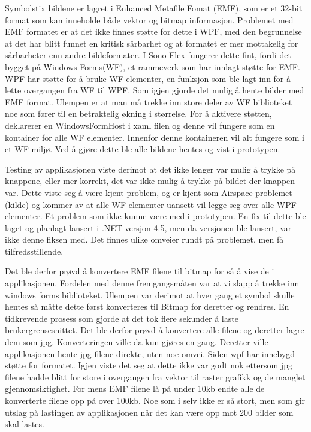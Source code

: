 { 
Symbolstix bildene er lagret i Enhanced Metafile Fomat (EMF), som er et 32-bit format som kan inneholde både vektor og bitmap informasjon\cite{AboutEMF}. Problemet med EMF formatet er at det ikke finnes støtte for dette i WPF, med den begrunnelse at det har blitt funnet en kritisk sårbarhet\cite{EMFVulnerability} og at formatet er mer mottakelig for sårbarheter\cite{EMFForum} enn andre bildeformater. I Sono Flex fungerer dette fint, fordi det bygget på Windows Forms(WF),  et rammeverk som har innlagt støtte for EMF. WPF har støtte for å bruke WF elementer,  en funksjon som ble lagt inn for å lette overgangen fra WF til WPF. Som igjen gjorde det mulig å hente bilder med EMF format. Ulempen er at man må trekke inn store deler av WF biblioteket noe som fører til en betraktelig økning i størrelse. For å aktivere støtten, deklarerer en WindowsFormHost i xaml filen og denne vil fungere som en kontainer for alle WF elementer. Innenfor denne kontaineren vil alt fungere som i et WF miljø. Ved å gjøre dette ble alle bildene hentes og vist i prototypen.  
 
 
Testing av applikasjonen viste derimot at det ikke lenger var mulig å trykke på knappene, eller mer korrekt, det var ikke mulig å trykke på  bildet der knappen var. Dette viste seg å være kjent problem, og er kjent som Airspace problemet (kilde) og kommer av at alle WF elementer uansett vil legge seg over alle WPF elementer. Et problem som ikke kunne være med i prototypen. En fix til dette ble laget og planlagt lansert i .NET versjon 4.5, men da versjonen ble lansert, var ikke denne fiksen med. Det finnes ulike omveier rundt på problemet, men få tilfredsstillende.  
 
 
Det ble derfor prøvd å konvertere EMF filene til bitmap for så å vise de i applikasjonen. Fordelen med denne fremgangsmåten var at vi slapp å trekke inn windows forms biblioteket. Ulempen var derimot at hver gang et symbol skulle hentes så måtte dette først konverteres til Bitmap for deretter og rendres. En tidkrevende prosess som gjorde at det tok flere sekunder å laste brukergrensesnittet. Det ble derfor prøvd å konvertere alle filene og deretter lagre dem som jpg. Konverteringen ville da kun gjøres en gang. Deretter ville applikasjonen hente jpg filene direkte, uten noe omvei. Siden wpf har innebygd støtte for formatet. Igjen viste det seg at dette ikke var godt nok ettersom jpg filene hadde blitt for store i overgangen fra vektor til raster grafikk og de manglet gjennomsiktighet. For mens EMF filene lå på under 10kb endte alle de konverterte filene opp på over 100kb. Noe som i selv ikke er så stort, men som gir utslag på lastingen av applikasjonen når det kan være opp mot 200 bilder som skal lastes. 
 
}
